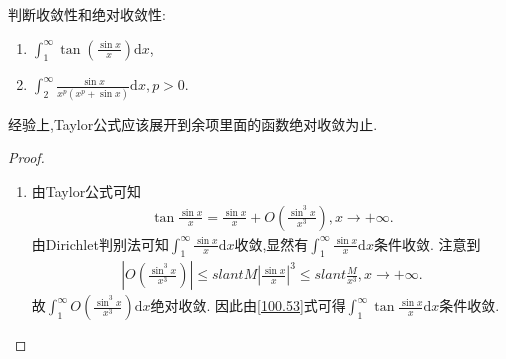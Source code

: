 \documentclass[../../main.tex]{subfiles}
\begin{document}
\begin{example}
判断收敛性和绝对收敛性:
\begin{enumerate}
\item \(\int_{1}^{\infty}\tan\left(\frac{\sin x}{x}\right)\mathrm{d}x\),

\item \(\int_{2}^{\infty}\frac{\sin x}{x^p(x^p + \sin x)}\mathrm{d}x,p > 0\). 
\end{enumerate}
\end{example}
\begin{note}
经验上,Taylor公式应该展开到余项里面的函数绝对收敛为止.
\end{note}
\begin{proof}
\begin{enumerate}
\item 由Taylor公式可知
\begin{align}
\tan\frac{\sin x}{x}=\frac{\sin x}{x}+O\left(\frac{\sin^3 x}{x^3}\right),x\rightarrow +\infty. \label{100.53}
\end{align}
由Dirichlet判别法可知\(\int_{1}^{\infty}\frac{\sin x}{x}\mathrm{d}x\)收敛,显然有\(\int_{1}^{\infty}\frac{\sin x}{x}\mathrm{d}x\)条件收敛. 注意到
\begin{align*}
\left|O\left(\frac{\sin^3 x}{x^3}\right)\right|\leqslant slant M\left|\frac{\sin x}{x}\right|^3\leqslant slant\frac{M}{x^3},x\rightarrow +\infty.
\end{align*}
故\(\int_{1}^{\infty}O\left(\frac{\sin^3 x}{x^3}\right)\mathrm{d}x\)绝对收敛. 因此由\eqref{100.53}式可得\(\int_{1}^{\infty}\tan\frac{\sin x}{x}\mathrm{d}x\)条件收敛.


\end{enumerate}
\end{proof}
\end{document}
